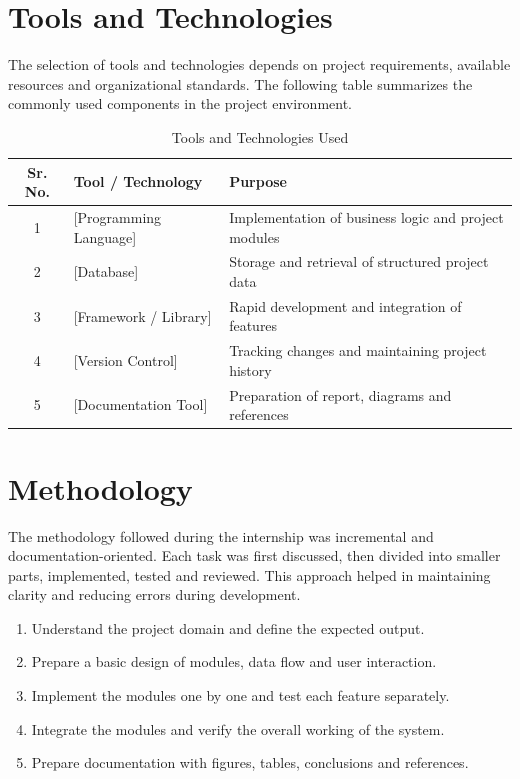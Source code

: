\documentclass[12pt,a4paper]{report}
\begin{document}
\section{Tools and Technologies}
The selection of tools and technologies depends on project requirements, available resources and organizational standards. The following table summarizes the commonly used components in the project environment.

\begin{table}[h!]
\centering
\caption{Tools and Technologies Used}
\begin{tabular}{|c|p{1.7in}|p{3.0in}|}
\hline
\textbf{Sr. No.} & \textbf{Tool / Technology} & \textbf{Purpose}\\ \hline
1 & [Programming Language] & Implementation of business logic and project modules\\ \hline
2 & [Database] & Storage and retrieval of structured project data\\ \hline
3 & [Framework / Library] & Rapid development and integration of features\\ \hline
4 & [Version Control] & Tracking changes and maintaining project history\\ \hline
5 & [Documentation Tool] & Preparation of report, diagrams and references\\ \hline
\end{tabular}
\end{table}

\section{Methodology}
The methodology followed during the internship was incremental and documentation-oriented. Each task was first discussed, then divided into smaller parts, implemented, tested and reviewed. This approach helped in maintaining clarity and reducing errors during development.

\begin{enumerate}[leftmargin=0.35in,itemsep=0pt,parsep=0pt]
\item Understand the project domain and define the expected output.
\item Prepare a basic design of modules, data flow and user interaction.
\item Implement the modules one by one and test each feature separately.
\item Integrate the modules and verify the overall working of the system.
\item Prepare documentation with figures, tables, conclusions and references.
\end{enumerate}
\clearpage
\end{document}
